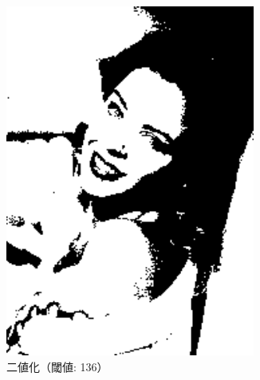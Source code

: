 \documentclass[a4paper,12pt]{jsarticle}
\begin{document}
\begin{figure}[!htbp]
\begin{subfigure}[b]{0.45\textwidth}
    \centering
    \includegraphics[width=0.9\textwidth]{./images/binarized_sample8_binary.png}
    \caption{二値化（閾値: 136）}
\end{subfigure}
\hfill
\begin{subfigure}[b]{0.45\textwidth}
    \centering

\end{subfigure}
\end{figure}
\end{document}

